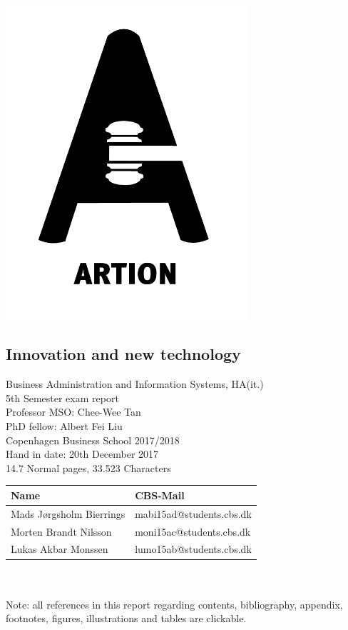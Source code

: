 \documentclass[a4paper,11pt,fleqn,dvipsnames,oneside,openright]{memoir}
\date{}
\begin{document}
\begin{center}
\includegraphics[width=9cm]{Logo.png}
\end{center}
\subsection*{Innovation and new technology}

Business Administration and Information Systems, HA(it.) \\
5th Semester exam report\\
Professor MSO: Chee-Wee Tan\\
PhD fellow: Albert Fei Liu\\
Copenhagen Business School 2017/2018\\
Hand in date: 20th December 2017\\
14.7 Normal pages, 33.523 Characters\\

\begin{tabu} to 0.8\textwidth { | X[l] | X[c] | }
   \hline
   \textbf{Name} & \textbf{CBS-Mail} \\
    \hline
   Mads Jørgsholm Bierrings  & mabi15ad@students.cbs.dk \\
    \hline
   Morten Brandt Nilsson  & moni15ac@students.cbs.dk \\
    \hline
   Lukas Akbar Monssen   & lumo15ab@students.cbs.dk \\
    \hline
\end{tabu}
\\\\
Note: all references in this report regarding contents, bibliography, appendix, footnotes, figures, illustrations and tables are clickable. 
\end{document}
